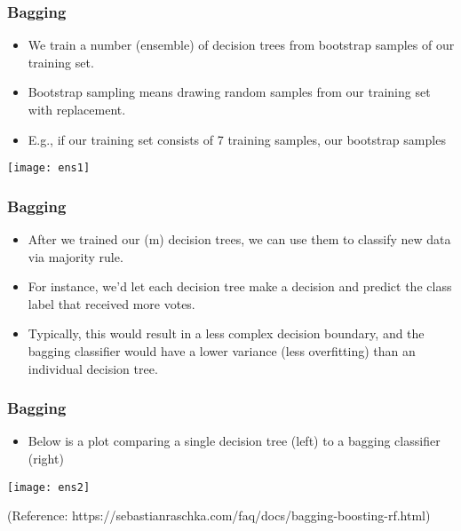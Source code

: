 \begin{frame}[fragile]\frametitle{Bagging}
\begin{itemize}
\item We train a number (ensemble) of decision trees from bootstrap samples of our training set. 
\item Bootstrap sampling means drawing random samples from our training set with replacement. 
\item E.g., if our training set consists of 7 training samples, our bootstrap samples
\end{itemize}
\begin{center}
\texttt{[image: ens1]}
\end{center}
\end{frame}

\begin{frame}[fragile]\frametitle{Bagging}
\begin{itemize}
\item After we trained our (m) decision trees, we can use them to classify new data via majority rule. 
\item For instance, we'd let each decision tree make a decision and predict the class label that received more votes. 
\item  Typically, this would result in a less complex decision boundary, and the bagging classifier would have a lower variance (less overfitting) than an individual decision tree. 
\end{itemize}

\end{frame}

\begin{frame}[fragile]\frametitle{Bagging}
\begin{itemize}
\item Below is a plot comparing a single decision tree (left) to a bagging classifier (right) 
\end{itemize}
\begin{center}
\texttt{[image: ens2]}
\end{center}
\tiny{(Reference: https://sebastianraschka.com/faq/docs/bagging-boosting-rf.html)}
\end{frame}


